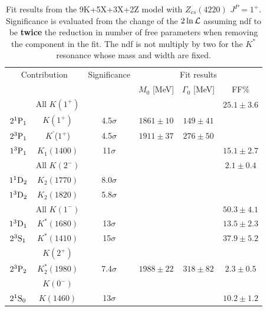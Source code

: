 \begin{table}[tbph]
\begin{center}
\caption{Fit results from  the 9K+5X+3X+2Z model with $Z_{cs}(4220)$ $J^P=1^+$. 
Significance is evaluated from the change of the $2\ln\mathcal{L}$ assuming ndf to be {\bf twice} the reduction in number of free parameters when removing the component in the fit. 
The ndf is not multiply by two for the $K^*$ resonance whose mass and width are fixed.}\label{tab:fit}
\begin{tabular}{cccccc}
\hline
\multicolumn{2}{c}{Contribution} &Significance & \multicolumn{3}{c}{Fit results}  \\
                  &                           &                 & $M_0$ [MeV]   & $\Gamma_0$ [MeV]      & FF\%          \\
\hline \hline
   &     All $K(1^+)$    &        &    &   &  $25.1\pm3.6$          \\
$2{}^{1}{\rm P}_{1}$   &  $K(1^+)$             & 4.5$\sigma$  &  $1861\pm 10 $  &  $149\pm41$  &       \\
$2{}^{3}{\rm P}_{1}$   &  $K^{\prime}$($1^+$)  & 4.5$\sigma$  &  $1911\pm 37 $  &  $276\pm50$  &       \\
$1{}^{3}{\rm P}_{1}$   &  $K_1(1400)$          & 11$\sigma$  &  &     &   $15.1\pm2.7$    \\
\hline

&     All $K(2^-)$    &        &        & &  $2.1\pm0.4$           \\
$1{}^{1}{\rm D}_{2}$   &  $K_2 (1770)$   & 8.0$\sigma$       &    &    &     \\
$1{}^{3}{\rm D}_{2}$   &  $K_2(1820)$    & 5.8$\sigma$       &    &    &     \\       

\hline
& All $K(1^-)$        & & & & $50.3\pm4.1$ \\
$1{}^{3}{\rm D}_{1}$   &  $K^*(1680)$    & 13$\sigma$  &   &    &  $13.5\pm2.3$    \\  
$2{}^{3}{\rm S}_{1}$   &  $K^*(1410)$    & 15$\sigma$   &   &    &  $37.9\pm5.2$   \\
\hline

& $K(2^+)$\\
$2{}^{3}{\rm P}_{2}$   &  $K^*_2(1980)$  & 7.4$\sigma$   &  $1988\pm22 $   &   $318\pm82$   & $2.3\pm0.5$        \\  
\hline 
& $K(0^-)$\\
$2{}^{1}{\rm S}_{0}$   &  $K(1460)$      & 13$\sigma$       &    &      & $10.2\pm1.2$    \\  


\end{tabular}
\end{center}
\end{table}
